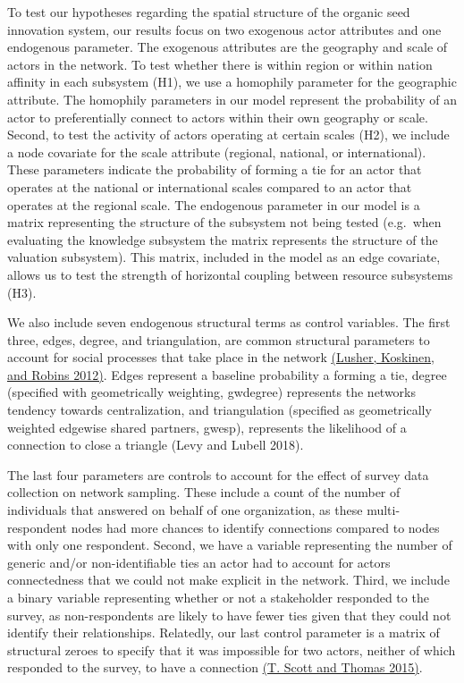 \documentclass[twoside,12pt,final]{ucthesis-CA2012}
\begin{document}
\begin{ucmainmatter}
To test our hypotheses regarding the spatial structure of the organic
seed innovation system, our results focus on two exogenous actor
attributes and one endogenous parameter. The exogenous attributes are
the geography and scale of actors in the network. To test whether there
is within region or within nation affinity in each subsystem (H1), we
use a \textquotesingle homophily\textquotesingle{} parameter for the geographic attribute. The
homophily parameters in our model represent the probability of an actor
to preferentially connect to actors within their own geography or scale.
Second, to test the activity of actors operating at certain scales (H2),
we include a node covariate for the scale attribute (regional, national,
or international). These parameters indicate the probability of forming
a tie for an actor that operates at the national or international scales
compared to an actor that operates at the regional scale. The endogenous
parameter in our model is a matrix representing the structure of the
subsystem not being tested (e.g.~when evaluating the knowledge subsystem
the matrix represents the structure of the valuation subsystem). This
matrix, included in the model as an edge covariate, allows us to test
the strength of horizontal coupling between resource subsystems (H3).

We also include seven endogenous structural terms as control variables.
The first three, edges, degree, and triangulation, are common structural
parameters to account for social processes that take place in the
network \href{https://www.zotero.org/google-docs/?SGAxDZ}{(Lusher, Koskinen, and Robins
2012)}. Edges represent a
baseline probability a forming a tie, degree (specified with
geometrically weighting, \textquotesingle gwdegree\textquotesingle) represents the network\textquotesingle s
tendency towards centralization, and triangulation (specified as
geometrically weighted edgewise shared partners, \textquotesingle gwesp\textquotesingle), represents
the likelihood of a connection to close a triangle (Levy and Lubell
2018).

The last four parameters are controls to account for the effect of
survey data collection on network sampling. These include a count of the
number of individuals that answered on behalf of one organization, as
these multi-respondent nodes had more chances to identify connections
compared to nodes with only one respondent. Second, we have a variable
representing the number of generic and/or non-identifiable ties an actor
had to account for actors\textquotesingle{} connectedness that we could not make
explicit in the network. Third, we include a binary variable
representing whether or not a stakeholder responded to the survey, as
non-respondents are likely to have fewer ties given that they could not
identify their relationships. Relatedly, our last control parameter is a
matrix of \textquotesingle structural zeroes\textquotesingle{} to specify that it was impossible for
two actors, neither of which responded to the survey, to have a
connection \href{https://www.zotero.org/google-docs/?9XONOV}{(T. Scott and Thomas
2015)}.


\end{ucmainmatter}
\end{document}
